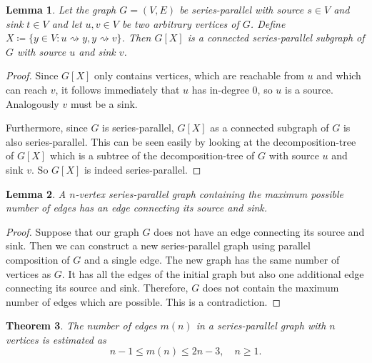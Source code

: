 \documentclass[]{article}
\newtheorem{theorem}{Theorem}[section]
\newtheorem{lemma}[theorem]{Lemma}
\numberwithin{equation}{section}
\begin{document}
\begin{lemma}
	\label{lemma:spgraph_subgraph}
	Let the graph $G=(V,E)$ be series-parallel with source $s \in V$ and sink $t \in V$ and let $u,v \in V$ be two arbitrary vertices of $G$. Define $X \coloneqq \{y \in V: u \rightsquigarrow y, y \rightsquigarrow v\}$. Then $G[X]$ is a connected series-parallel subgraph of $G$ with source $u$ and sink $v$.
\end{lemma}

\begin{proof}
	Since $G[X]$ only contains vertices, which are reachable from $u$ and which can reach $v$, it follows immediately that $u$ has in-degree 0, so $u$ is a source. Analogously $v$ must be a sink.
	
	Furthermore, since $G$ is series-parallel, $G[X]$ as a connected subgraph of $G$ is also series-parallel. This can be seen easily by looking at the decomposition-tree of $G[X]$ which is a subtree of the decomposition-tree of $G$ with source $u$ and sink $v$. So $G[X]$ is indeed series-parallel.
\end{proof}

\begin{lemma}
	\label{lemma:spgraph_maxedges}
	A $n$-vertex series-parallel graph containing the maximum possible number of edges has an edge connecting its source and sink.
\end{lemma}

\begin{proof}
	Suppose that our graph $G$ does not have an edge connecting its source and sink. Then we can construct a new series-parallel graph using parallel composition of $G$ and a single edge. The new graph has the same number of vertices as $G$. It has all the edges of the initial graph but also one additional edge connecting its source and sink. Therefore, $G$ does not contain the maximum number of edges which are possible. This is a contradiction.
\end{proof}

\begin{theorem}
	\label{thm:spgraph_numberofedges}
	The number of edges $m(n)$ in a series-parallel graph with $n$ vertices is estimated as
	$$n-1 \leq m(n) \leq 2n-3,\quad n\geq 1.$$
\end{theorem}
\end{document}
